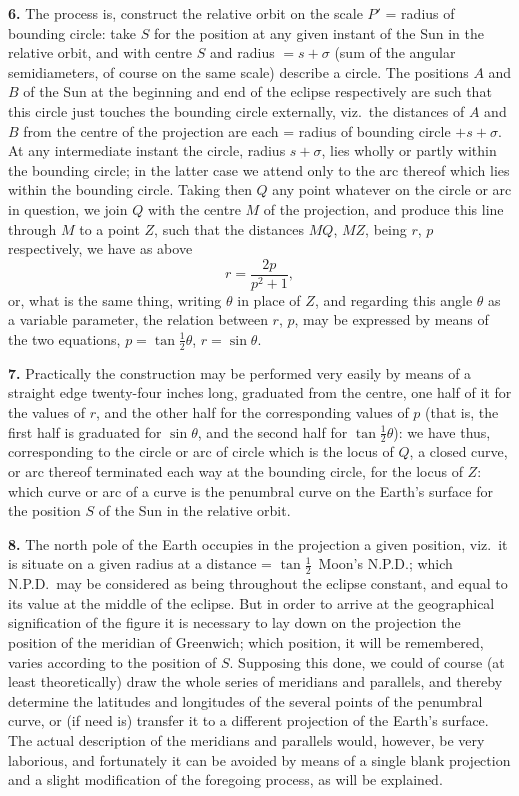\documentclass[11pt,a4paper]{article}
\begin{document}
\noindent\textbf{6.} The process is, construct the relative orbit on the scale $P'$ = radius of bounding circle: take $S$ for the position at any given instant of the Sun in the relative orbit, and with centre $S$ and radius $= s + \sigma$ (sum of the angular semidiameters, of course on the same scale) describe a circle. The positions $A$ and $B$ of the Sun at the beginning and end of the eclipse respectively are such that this circle just touches the bounding circle externally, viz.\ the distances of $A$ and $B$ from the centre of the projection are each = radius of bounding circle $+ s + \sigma$. At any intermediate instant the circle, radius $s + \sigma$, lies wholly or partly within the bounding circle; in the latter case we attend only to the arc thereof which lies within the bounding circle. Taking then $Q$ any point whatever on the circle or arc in question, we join $Q$ with the centre $M$ of the projection, and produce this line through $M$ to a point $Z$, such that the distances $MQ$, $MZ$, being $r$, $p$ respectively, we have as above
\[
r = \frac{2p}{p^{2}+1},
\]
or, what is the same thing, writing $\theta$ in place of $Z$, and regarding this angle $\theta$ as a variable parameter, the relation between $r$, $p$, may be expressed by means of the two equations, $p = \tan \tfrac{1}{2}\theta$, $r = \sin \theta$.

\noindent\textbf{7.} Practically the construction may be performed very easily by means of a straight edge twenty-four inches long, graduated from the centre, one half of it for the values of $r$, and the other half for the corresponding values of $p$ (that is, the first half is graduated for $\sin \theta$, and the second half for $\tan \tfrac{1}{2}\theta$): we have thus, corresponding to the circle or arc of circle which is the locus of $Q$, a closed curve, or arc thereof terminated each way at the bounding circle, for the locus of $Z$: which curve or arc of a curve is the penumbral curve on the Earth's surface for the position $S$ of the Sun in the relative orbit.

\noindent\textbf{8.} The north pole of the Earth occupies in the projection a given position, viz.\ it is situate on a given radius at a distance = $\tan \tfrac{1}{2}$\ Moon's N.P.D.; which N.P.D.\ may be considered as being throughout the eclipse constant, and equal to its value at the middle of the eclipse. But in order to arrive at the geographical signification of the figure it is necessary to lay down on the projection the position of the meridian of Greenwich; which position, it will be remembered, varies according to the position of $S$. Supposing this done, we could of course (at least theoretically) draw the whole series of meridians and parallels, and thereby determine the latitudes and longitudes of the several points of the penumbral curve, or (if need is) transfer it to a different projection of the Earth's surface. The actual description of the meridians and parallels would, however, be very laborious, and fortunately it can be avoided by means of a single blank projection and a slight modification of the foregoing process, as will be explained.
\end{document}
